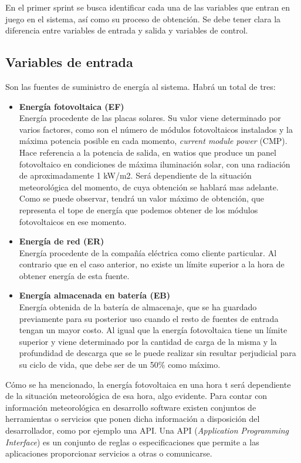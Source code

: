 En el primer sprint se busca identificar cada una de las variables que entran en juego en el sistema, así como su proceso de obtención. Se debe tener clara la diferencia entre variables de entrada y salida y variables de control.
\subsection{Variables de entrada}
Son las fuentes de suministro de energía al sistema. Habrá un total de tres:
\begin{itemize}
	\item \textbf{Energía fotovoltaica (EF)}\\ Energía procedente de las placas solares. Su valor viene determinado por varios factores, como son el número de módulos fotovoltaicos instalados y la máxima potencia posible en cada momento, \textit{current module power} (CMP). Hace referencia a la potencia de salida, en watios que produce un panel fotovoltaico en condiciones de máxima iluminación solar, con una radiación de aproximadamente 1 kW/m2. Será dependiente de la situación meteorológica del momento, de cuya obtención se hablará mas adelante. Como se puede observar, tendrá un valor máximo de obtención, que representa el tope de energía que podemos obtener de los módulos fotovoltaicos en ese momento.
	\item \textbf{Energía de red (ER)}\\ Energía procedente de la compañía eléctrica como cliente particular. Al contrario que en el caso anterior, no existe un límite superior a la hora de obtener energía de esta fuente.
	\item \textbf{Energía almacenada en batería (EB)}\\ Energía obtenida de la batería de almacenaje, que se ha guardado previamente para su posterior uso cuando el resto de fuentes de entrada tengan un mayor costo. Al igual que la energía fotovoltaica tiene un límite superior y viene determinado por la cantidad de carga de la misma y la profundidad de descarga que se le puede realizar sin resultar perjudicial para su ciclo de vida, que debe ser de un 50\% como máximo.
\end{itemize}

Cómo se ha mencionado, la energía fotovoltaica en una hora t será dependiente de la situación meteorológica de esa hora, algo evidente. Para contar con información meteorológica en desarrollo software existen conjuntos de herramientas o servicios que ponen dicha información a disposición del desarrollador, como por ejemplo una API. Una API (\textit{Application Programming Interface}) es un conjunto de reglas o especificaciones que permite a las aplicaciones proporcionar servicios a otras o comunicarse.\\

